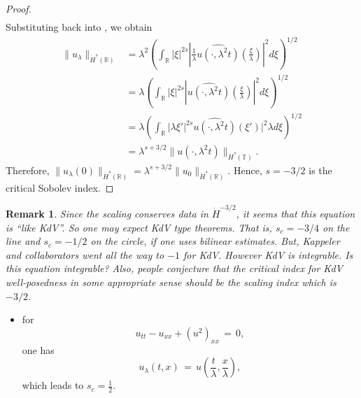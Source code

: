 \documentclass[12pt,reqno]{amsart}
\numberwithin{equation}{section}  %
\renewcommand{\cref}{\Cref}
\newcommand{\rr}{\mathbb{R}}
\newcommand{\ci}{\mathbb{T}}
\newcommand{\wh}{\widehat}
\newtheorem{remark}[theorem]{Remark}
\begin{document}
\begin{proof}
\begin{equation*}
\begin{split}
\end{split}
\end{equation*}
%
%
Substituting back into \cref{crit-ind-comp}, we obtain
%
%
\begin{equation*}
\begin{split}
  \| u_{\lambda} \|_{\dot{H}^s(\rr)} 
  & = \lambda^{2} \left( \int_{\rr} | \xi |^{2s} |
  \frac{1}{\lambda}\wh{u(\cdot, \lambda^{2}t)}(\frac{\xi}{\lambda}) |^2 d \xi
  \right)^{1/2}
  \\
  & = \lambda \left( \int_{\rr}| \xi |^{2s} | \wh{u(\cdot,
  \lambda^{2}t)}(\frac{\xi}{\lambda}) |^2 d \xi  \right)^{1/2}
  \\
  & = \lambda \left( \int_{\rr} | \lambda \xi' |^{2s} 
  \wh{u(\cdot, \lambda^{2}t)}(\xi') |^2 \lambda d \xi
  \right)^{1/2}
  \\
  & = \lambda^{s + 3/2} \|u(\cdot, \lambda^{2}t) \|_{\dot{H}^s (\ci)}.
\end{split}
\end{equation*}
%
%
Therefore, $\| u_{\lambda}(0) \|_{\dot{H}^s(\rr)} = \lambda^{s + 3/2} \|
u_{0} \|_{\dot{H}^{s}(\rr)}$. Hence, $s=-3/2$ is the critical Sobolev index.
\end{proof}
%
%
\begin{framed}
\begin{remark}
Since the scaling conserves data in $\dot{H}^{-3/2}$, it
seems that this equation is ``like KdV''.
So one may expect KdV type theorems.
That is, $s_c=-3/4$ on the line and $s_c=-1/2$ on the circle,
if one uses bilinear estimates.
But, Kappeler and collaborators went all the way to $-1$ for KdV.
However KdV is integrable. Is this equation integrable?
Also, people conjecture that the critical index for KdV well-posedness 
in some appropriate sense should be the scaling index which is  $-3/2$.
\label{rem:kdv-like}
\end{remark}
\end{framed}
%
%
\begin{itemize}
  \item for 
    \[
    u_{tt}-u_{xx}+(u^2)_{xx}\,=\,0,
    \]
    one has 
    \[
    u_{\lambda}(t,x)\,=\,u\left(\frac{t}{\lambda}, \frac{x}{\lambda}\right),
    \]
    which leads to $s_c=\frac 12$.
\end{itemize}
\end{document}
